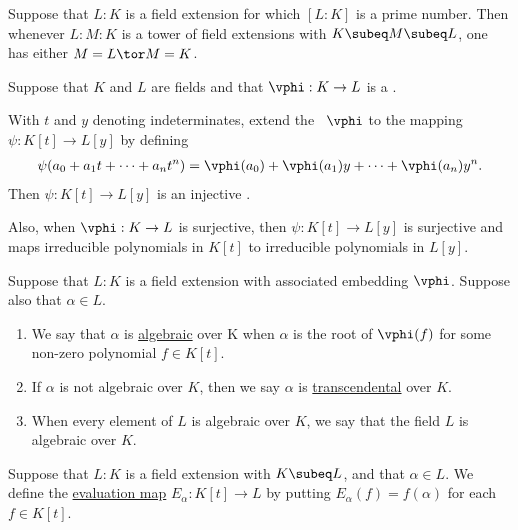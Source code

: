 \documentclass{article}
\begin{document}
  \begin{tcorollary}
    Suppose that \( L:K \) is a field extension for which \( [L: K] \) is a prime number.
    Then whenever \( L : M : K \) is a tower of field extensions with \( K \subeq M \subeq L \), one has either \( M= L \tor M= K \).
  \end{tcorollary}

  \begin{tproposition}
    Suppose that \( K \) and \( L \) are fields and that \( \vphi : K \to L \) is a \homo.

    With \( t \) and \( y \) denoting indeterminates, extend the \homo~\( \vphi \) to the mapping \( \psi: K[t] \to L[y] \) by defining \begin{align*}
      \psi(a_0 + a_1t+\cdots + a_n t^n) = \vphi(a_0) + \vphi(a_1)y+\cdots + \vphi(a_n)y^n.
    \end{align*}
    Then \( \psi:K[t]\to L[y] \) is an injective \homo.

    Also, when \( \vphi:K\to L \) is surjective, then \( \psi: K[t]\to L[y] \) is surjective and maps irreducible polynomials in \( K[t] \) to irreducible polynomials in \( L[y] \).
  \end{tproposition}

  \begin{tdefinition}
    Suppose that \( L: K \) is a field extension with associated embedding \( \vphi \).
    Suppose also that \( \alpha\in L \).
\begin{enumerate}[label=(\roman*)]
      \item We say that \( \alpha \) is \ul{algebraic} over K when \( \alpha \) is the root of \( \vphi(f) \) for some non-zero polynomial \( f \in K[t] \).
      \item If \( \alpha \) is not algebraic over \( K \), then we say \( \alpha \) is \ul{transcendental} over \( K \).
      \item When every element of \( L \) is algebraic over \( K \), we say that the field \( L \) is algebraic over \( K \).
    \end{enumerate}
  \end{tdefinition}

  \begin{tdefinition}
    Suppose that \( L: K \) is a field extension with \( K \subeq L \), and that \( \alpha\in L \).
    We define the \ul{evaluation map} \( E_\alpha : K[t] \to L \) by putting \( E_\alpha(f) = f(\alpha) \) for each \( f \in K[t] \).
  \end{tdefinition}
\end{document}
